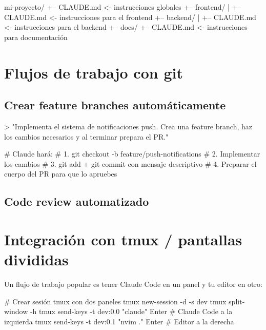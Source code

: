 \documentclass[11pt,a4paper]{report}
\begin{document}
\begin{codebox}
mi-proyecto/
+-- CLAUDE.md              <- instrucciones globales
+-- frontend/
|   +-- CLAUDE.md          <- instrucciones para el frontend
+-- backend/
|   +-- CLAUDE.md          <- instrucciones para el backend
+-- docs/
    +-- CLAUDE.md          <- instrucciones para documentación
\end{codebox}

\section{Flujos de trabajo con git}

\subsection{Crear feature branches automáticamente}

\begin{codebox}
> "Implementa el sistema de notificaciones push. Crea una feature branch,
   haz los cambios necesarios y al terminar prepara el PR."

# Claude hará:
# 1. git checkout -b feature/push-notifications
# 2. Implementar los cambios
# 3. git add + git commit con mensaje descriptivo
# 4. Preparar el cuerpo del PR para que lo apruebes
\end{codebox}

\subsection{Code review automatizado}


\section{Integración con tmux / pantallas divididas}

Un flujo de trabajo popular es tener Claude Code en un panel y tu editor en otro:

\begin{codebox}
# Crear sesión tmux con dos paneles
tmux new-session -d -s dev
tmux split-window -h
tmux send-keys -t dev:0.0 "claude" Enter  # Claude Code a la izquierda
tmux send-keys -t dev:0.1 "nvim ." Enter  # Editor a la derecha
\end{codebox}
\end{document}
